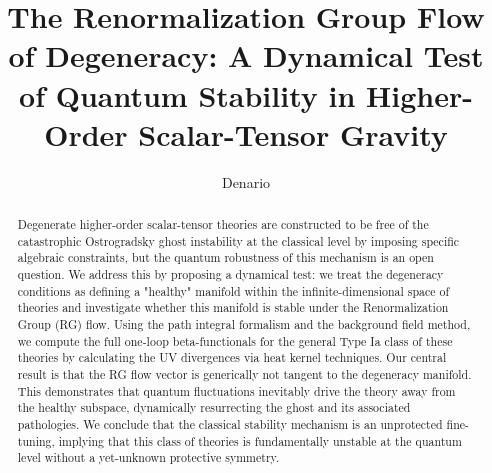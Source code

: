 \documentclass[twocolumn]{aastex631}
\begin{document}
\title{The Renormalization Group Flow of Degeneracy: A Dynamical Test of Quantum Stability in Higher-Order Scalar-Tensor Gravity}

\author{Denario}

\begin{abstract}
Degenerate higher-order scalar-tensor theories are constructed to be free of the catastrophic Ostrogradsky ghost instability at the classical level by imposing specific algebraic constraints, but the quantum robustness of this mechanism is an open question. We address this by proposing a dynamical test: we treat the degeneracy conditions as defining a "healthy" manifold within the infinite-dimensional space of theories and investigate whether this manifold is stable under the Renormalization Group (RG) flow. Using the path integral formalism and the background field method, we compute the full one-loop beta-functionals for the general Type Ia class of these theories by calculating the UV divergences via heat kernel techniques. Our central result is that the RG flow vector is generically not tangent to the degeneracy manifold. This demonstrates that quantum fluctuations inevitably drive the theory away from the healthy subspace, dynamically resurrecting the ghost and its associated pathologies. We conclude that the classical stability mechanism is an unprotected fine-tuning, implying that this class of theories is fundamentally unstable at the quantum level without a yet-unknown protective symmetry.
\end{abstract}

\end{document}
